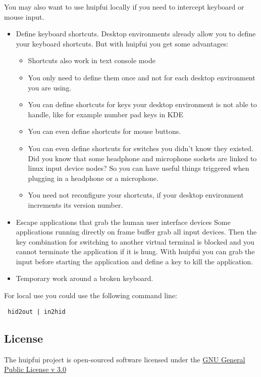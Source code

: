 You may also want to use huipfui locally if you need to intercept keyboard or
mouse input. 
\begin{itemize}
\item Define keyboard shortcuts. 
  Desktop environments already allow you to define your keyboard shortcuts.
  But with huipfui you get some advantages:
  \begin{itemize}
  \item Shortcuts also work in text console mode
  \item You only need to define them once and not for each desktop environment
    you are using.
  \item You can define shortcuts for keys your desktop environment is not 
    able to handle, like for example number pad keys in KDE
  \item You can even define shortcuts for mouse buttons.
  \item You can even define shortcuts for switches you didn't know they existed.
    Did you know that some headphone and microphone sockets are linked
    to linux input device nodes? So you can have useful things triggered
    when plugging in a headphone or a microphone.
  \item You need not reconfigure your shortcuts, if your desktop environment 
    increments its version number.
  \end{itemize}
\item Escape applications that grab the human user interface devices
  Some applications running directly on frame buffer grab all input devices.
  Then the key combination for switching to another virtual terminal is 
  blocked and you cannot terminate the application if it is hung.
  With huipfui you can grab the input before starting the application and
  define a key to kill the application.
\item Temporary work around a broken keyboard.
\end{itemize}
For local use you could use the following command line:
\begin{verbatim}
 hid2out | in2hid
\end{verbatim}


\subsection{License}\label{license}

The huipfui project is open-sourced software licensed under the
\href{https://opensource.org/licenses/GPL-3.0}{GNU General Public
License v 3.0}

